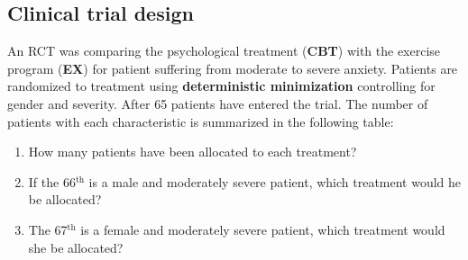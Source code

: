\documentclass[a4paper,11pt]{article}
\begin{document}
\begin{CJK*}{UTF8}{gbsn}
\section{Clinical trial design}
An RCT was comparing the psychological treatment (\textbf{CBT}) with the exercise program 
(\textbf{EX}) for patient suffering from moderate to severe anxiety. Patients are randomized 
to treatment using \textbf{deterministic minimization} controlling for gender and severity. After 
65 patients have entered the trial. The number of patients with each characteristic is summarized 
in the following table:
\begin{table}
\caption{Number of patients for each characteristic}
\end{table}
\begin{enumerate}[(1)]
	\item How many patients have been allocated to each treatment?
	\item If the 66$^{\textrm{th}}$ is a male and moderately severe patient, 
		which treatment would he be allocated?
	\item The 67$^{\textrm{th}}$ is a female and moderately severe patient, 
		which treatment would she be allocated? 
\end{enumerate}




\end{CJK*}
\end{document}
